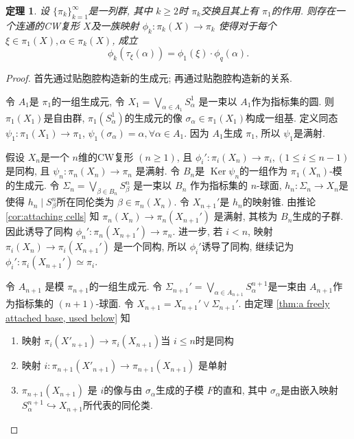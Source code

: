 \documentclass{ctexart}
\theoremstyle{plain}
\newtheorem{theorem}{定理}[section]
\theoremstyle{definition}
\begin{document}
        \begin{theorem}
            \label{thm:spaces with prescribed homotopy groups}
            设 $\{\pi_{k}\}_{k=1}^{\infty}$是一列群, 其中 $k\ge 2$时 $\pi_{k}$交换且其上有 $\pi_1$的作用. 则存在一个连通的CW复形 $X$及一族映射 $\phi_{k}:\pi_{k}(X)\to \pi_{k}$ 使得对于每个 $\xi \in \pi_1(X), \alpha \in \pi_{k}(X)$, 成立
            \begin{equation*}
              \phi_{k}(\tau_{\xi}(\alpha))=\phi_{1}(\xi)\cdot \phi_{q}(\alpha).
            \end{equation*}
        \end{theorem}

        \begin{proof}
            首先通过贴胞腔构造新的生成元; 再通过贴胞腔构造新的关系.

            令 $A_1$是 $\pi_1$的一组生成元, 令 $X_1= \bigvee _{\alpha \in A_1}S^{1}_{\alpha}$ 是一束以 $A_1$作为指标集的圆. 则 $\pi_1(X_1)$是自由群, $\pi_1 (S^{1}_{\alpha})$的生成元的像 $\sigma_{\alpha}\in \pi_1 (X_1)$构成一组基. 定义同态 $\psi_1:\pi_1(X_1)\to \pi_1$, $\psi_1(\sigma_{\alpha})=\alpha, \forall \alpha \in A_1$. 因为 $A_1$生成 $\pi_1$, 所以 $\psi_1$是满射.

            假设 $X_{n}$是一个 $n$维的CW复形 $(n\ge 1)$, 且 $\phi_{i}':\pi_{i}(X_{n})\to \pi_{i}, (1\le i\le n-1)$ 是同构, 且 $\psi_{n}:\pi_{n}(X_{n})\to \pi_{n}$ 是满射. 令 $B_{n}$是 $\operatorname{Ker}\psi_{n}$的一组作为 $\pi_1(X_{n})$-模的生成元. 令 $\Sigma_{n}=\bigvee_{\beta \in B_{n}}S^{n}_{\beta}$ 是一束以 $B_{n}$ 作为指标集的 $n$-球面, $h_{n}:\Sigma_{n}\to X_{n}$是使得 $h_{n}\mid S^{n}_{\beta}$所在同伦类为 $\beta\in \pi_{n}(X_{n})$. 令 $X_{n+1}'$是 $h_{n}$的映射锥. 由推论 \ref{cor:attaching cells} 知 $\pi_{n}(X_{n})\to \pi_{n}(X_{n+1}')$ 是满射, 其核为 $B_{n}$生成的子群. 因此诱导了同构 $\phi_{n}':\pi_{n}(X_{n+1}')\to \pi_{n}$. 进一步, 若 $i<n$, 映射 $\pi_{i}(X_{n})\to \pi_{i}(X_{n+1}')$ 是一个同构, 所以 $\phi_{i}'$诱导了同构, 继续记为 $\phi_{i}':\pi_{i}(X_{n+1}')\simeq \pi_{i}$.

            令 $A_{n+1}$ 是模 $\pi_{n+1}$的一组生成元. 令 $\Sigma_{n+1}'=\bigvee_{\alpha \in A_{n+1}}S_{\alpha}^{n+1}$是一束由 $A_{n+1}$作为指标集的 $(n+1)$-球面. 令 $X_{n+1}=X_{n+1}'\vee \Sigma_{n+1}'$. 由定理 \ref{thm:a freely attached base, used below} 知 
            \begin{enumerate}
                \item 映射 $\pi_{i}(X'_{n+1})\to \pi_{i}(X_{n+1})$当 $i\le n$时是同构 
                \item 映射 $i:\pi_{n+1}(X'_{n+1})\to \pi_{n+1}(X_{n+1})$ 是单射 
                \item $\pi_{n+1}(X_{n+1})$ 是 $i$的像与由 $\sigma_{\alpha}$生成的子模 $F$的直和, 其中 $\sigma_{\alpha}$是由嵌入映射 $S^{n+1}_{\alpha}\hookrightarrow X_{n+1}$所代表的同伦类.
            \end{enumerate}


\end{proof}
\end{document}
